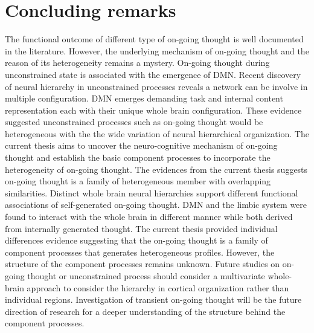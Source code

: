 \section{Concluding remarks}
\label{ch:discussion:summary}
The functional outcome of different type of on-going thought is well documented in the literature. However, the underlying mechanism of on-going thought and the reason of its heterogeneity remains a mystery. On-going thought during unconstrained state is associated with the emergence of DMN. Recent discovery of neural hierarchy in unconstrained processes reveals a network can be involve in multiple configuration. DMN emerges demanding task and internal content representation each with their unique whole brain configuration. These evidence suggested unconstrained processes such as on-going thought would be heterogeneous with the the wide variation of neural hierarchical organization. The current thesis aims to uncover the neuro-cognitive mechanism of on-going thought and establish the basic component processes to incorporate the heterogeneity of on-going thought. The evidences from the current thesis suggests on-going thought is a family of heterogeneous member with overlapping similarities. Distinct whole brain neural hierarchies support different functional associations of self-generated on-going thought. DMN and the limbic system were found to interact with the whole brain in different manner while both derived from internally generated thought. The current thesis provided individual differences evidence suggesting that the on-going thought is a family of component processes that generates heterogeneous profiles. However, the structure of the component processes remains unknown. Future studies on on-going thought or unconstrained process should consider a multivariate whole-brain approach to consider the hierarchy in cortical organization rather than individual regions. Investigation of transient on-going thought will be the future direction of research for a deeper understanding of the structure behind the component processes. 